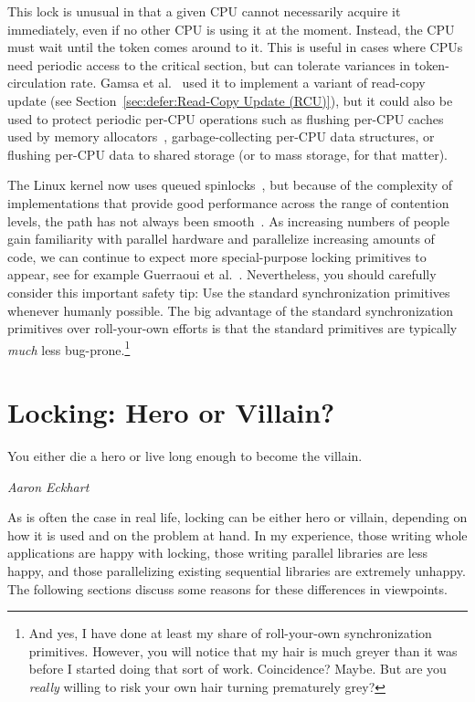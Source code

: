 This lock is unusual in that a given CPU cannot necessarily acquire it
immediately, even if no other CPU is using it at the moment.
Instead, the CPU must wait until the token comes around to it.
This is useful in cases where CPUs need periodic access to the critical
section, but can tolerate variances in token-circulation rate.
Gamsa et al.~\cite{Gamsa99} used it to implement a variant of
read-copy update (see Section~\ref{sec:defer:Read-Copy Update (RCU)}),
but it could also be used to protect periodic per-CPU operations such
as flushing per-CPU caches used by memory allocators~\cite{McKenney93},
garbage-collecting per-CPU data structures, or flushing per-CPU
data to shared storage (or to mass storage, for that matter).

The Linux kernel now uses queued spinlocks~\cite{JonathanCorbet2014qspinlocks},
but because of the complexity of implementations that provide good
performance across the range of contention levels, the path has not
always been smooth~\cite{CatalinMarinas2018qspinlockTLA,WillDeacon2018qspinlock}.
As increasing numbers of people gain familiarity with parallel hardware
and parallelize increasing amounts of code, we can continue to expect more
special-purpose locking primitives to appear, see for example Guerraoui et
al.~\cite{Guerraoui:2019:LPA:3319851.3301501,HugoGuirouxPhD}.
Nevertheless, you should carefully consider this important safety tip:
Use the standard synchronization primitives whenever humanly possible.
The big advantage of the standard synchronization primitives over
roll-your-own efforts is that the standard primitives are typically
\emph{much} less bug-prone.\footnote{
	And yes, I have done at least my share of roll-your-own
	synchronization primitives.
	However, you will notice that my hair is much greyer than
	it was before I started doing that sort of work.
	Coincidence?
	Maybe.
	But are you \emph{really} willing to risk your own hair turning
	prematurely grey?}



\section{Locking: Hero or Villain?}
\label{sec:locking:Locking: Hero or Villain?}
%
\epigraph{You either die a hero or live long enough to become the villain.}
	 {\emph{Aaron Eckhart}}

As is often the case in real life, locking can be either hero or villain,
depending on how it is used and on the problem at hand.
In my experience, those writing whole applications are happy with
locking, those writing parallel libraries are less happy, and those
parallelizing existing sequential libraries are extremely unhappy.
The following sections discuss some reasons for these differences in
viewpoints.

